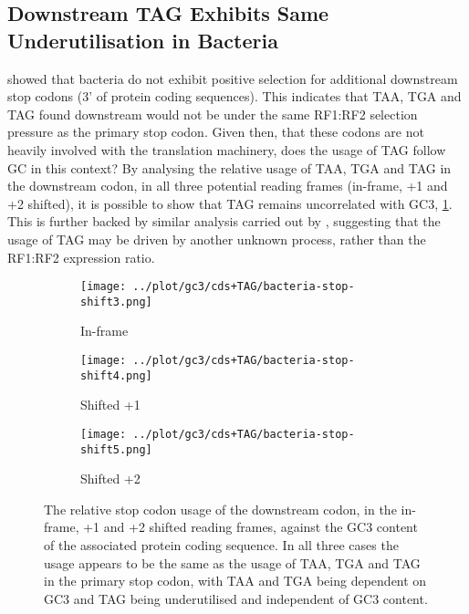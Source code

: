\documentclass[../main.tex]{subfile}
\begin{document}
    \subsection{Downstream TAG Exhibits Same Underutilisation in Bacteria}
        \textcite{Ho2019} showed that bacteria do not exhibit positive selection for additional downstream stop codons (3' of protein coding sequences). This indicates that TAA, TGA and TAG found downstream would not be under the same RF1:RF2 selection pressure as the primary stop codon. Given then, that these codons are not heavily involved with the translation machinery, does the usage of TAG follow GC in this context? By analysing the relative usage of TAA, TGA and TAG in the downstream codon, in all three potential reading frames (in-frame, +1 and +2 shifted), it is possible to show that TAG remains uncorrelated with GC3, \cref{fig:results/bacteria/protein/shifted}. This is further backed by similar analysis carried out by \textcite{Ho2019}, suggesting that the usage of TAG may be driven by another unknown process, rather than the RF1:RF2 expression ratio.

        \begin{figure}[H]
            \centering
            \begin{subfigure}{.45\textwidth}
                \texttt{[image: ../plot/gc3/cds+TAG/bacteria-stop-shift3.png]}
                \caption{In-frame}
            \end{subfigure}
            \begin{subfigure}{.45\textwidth}
                \texttt{[image: ../plot/gc3/cds+TAG/bacteria-stop-shift4.png]}
                \caption{Shifted +1}
            \end{subfigure}
            \begin{subfigure}{.45\textwidth}
                \texttt{[image: ../plot/gc3/cds+TAG/bacteria-stop-shift5.png]}
                \caption{Shifted +2}
            \end{subfigure}

            \caption{%
                The relative stop codon usage of the downstream codon, in the in-frame, +1 and +2 shifted reading frames, against the GC3 content of the associated protein coding sequence. In all three cases the usage appears to be the same as the usage of TAA, TGA and TAG in the primary stop codon, with TAA and TGA being dependent on GC3 and TAG being underutilised and independent of GC3 content.
            }
            \label{fig:results/bacteria/protein/shifted}
        \end{figure}
\end{document}
